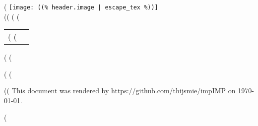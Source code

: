\documentclass[a4paper]{article}
\begin{document}
(%
    \flushright
    \texttt{[image: ((\% header.image | escape\_tex \%))]} \\
    ((%
    \flushleft
(%
(%
    \begin{tabular}{l l}
        (%
            (%
                \textit{ ((%
            (%
                \textit{ ((%
            (%
        (%
    \end{tabular}
(%
\vspace{1cm}
(%


(%
(%
\vfill
\hline
\begin{center}
\footnotesize
((%
This document was rendered by \url{https://github.com/thijsmie/imp}{IMP} on \today.
\end{center}
(%
\end{document}
